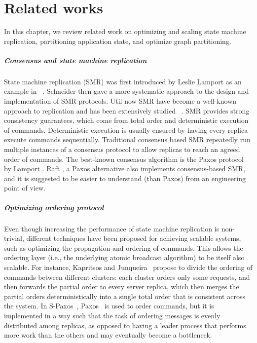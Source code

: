 \chapter[Related works]{Related works}
\label{sec:rw}

In this chapter, we review related work on optimizing and scaling state machine
replication, partitioning application state, and optimize graph partitioning.

\paragraph{Consensus and state machine replication}
State machine replication (SMR) was first introduced by Leslie Lamport as an
example in ~\cite{Lam78}. Schneider \cite{Sch90} then gave a more systematic
approach to the design and implementation of SMR protocols. Util now SMR have
become a well-known approach to replication and has been extensively studied
~\cite{Kapritsos:2012um, Kotla:2004ep, santos2013htsmr}. SMR provides strong
consistency guarantees, which come from total order and deterministic execution
of commands. Deterministic execution is usually ensured by having every replica
execute commands sequentially. Traditional consensus based SMR repeatedly run
multiple instances of a consensus protocol to allow replicas to reach an agreed
order of commands. The best-known consensus algorithm is the Paxos protocol by
Lamport \cite{Lam98}. Raft \cite{184040}, a Paxos alternative also
implements consensus-based SMR, and it is suggested to be easier to understand
(than Paxos) from an engineering point of view.

\paragraph{Optimizing ordering protocol}

Even though increasing the performance of state machine replication is
non-trivial, different techniques have been proposed for achieving scalable
systems, such as optimizing the propagation and ordering of commands. This
allows the ordering layer (i.e., the underlying atomic broadcast algorithm) to
be itself also scalable. For instance, Kapritsos and
Junqueira~\cite{kapritsos2010scalable} propose to divide the ordering of
commands between different clusters: each cluster orders only some requests, and
then forwards the partial order to every server replica, which then merges the
partial orders deterministically into a single total order that is consistent
across the system. In S-Paxos~\cite{biely2012spaxos}, Paxos~\cite{Lam98} is used
to order commands, but it is implemented in a way such that the task of ordering
messages is evenly distributed among replicas, as opposed to having a leader
process that performs more work than the others and may eventually become a
bottleneck.

